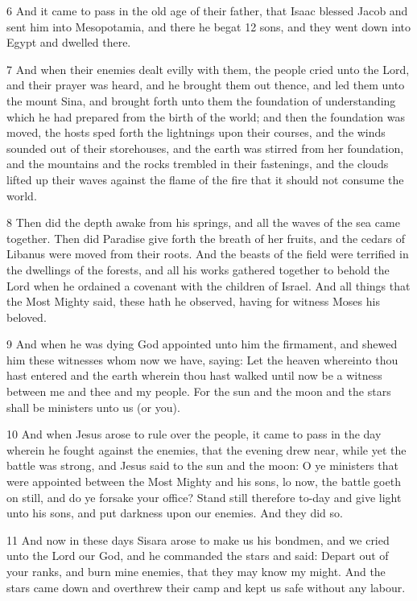 \par 6 And it came to pass in the old age of their father, that Isaac blessed Jacob and sent him into Mesopotamia, and there he begat 12 sons, and they went down into Egypt and dwelled there.

\par 7 And when their enemies dealt evilly with them, the people cried unto the Lord, and their prayer was heard, and he brought them out thence, and led them unto the mount Sina, and brought forth unto them the foundation of understanding which he had prepared from the birth of the world; and then the foundation was moved, the hosts sped forth the lightnings upon their courses, and the winds sounded out of their storehouses, and the earth was stirred from her foundation, and the mountains and the rocks trembled in their fastenings, and the clouds lifted up their waves against the flame of the fire that it should not consume the world. 

\par 8 Then did the depth awake from his springs, and all the waves of the sea came together. Then did Paradise give forth the breath of her fruits, and the cedars of Libanus were moved from their roots. And the beasts of the field were terrified in the dwellings of the forests, and all his works gathered together to behold the Lord when he ordained a covenant with the children of Israel. And all things that the Most Mighty said, these hath he observed, having for witness Moses his beloved.

\par 9 And when he was dying God appointed unto him the firmament, and shewed him these witnesses whom now we have, saying: Let the heaven whereinto thou hast entered and the earth wherein thou hast walked until now be a witness between me and thee and my people. For the sun and the moon and the stars shall be ministers unto us (or you).

\par 10 And when Jesus arose to rule over the people, it came to pass in the day wherein he fought against the enemies, that the evening drew near, while yet the battle was strong, and Jesus said to the sun and the moon: O ye ministers that were appointed between the Most Mighty and his sons, lo now, the battle goeth on still, and do ye forsake your office? Stand still therefore to-day and give light unto his sons, and put darkness upon our enemies. And they did so.

\par 11 And now in these days Sisara arose to make us his bondmen, and we cried unto the Lord our God, and he commanded the stars and said: Depart out of your ranks, and burn mine enemies, that they may know my might. And the stars came down and overthrew their camp and kept us safe without any labour.

